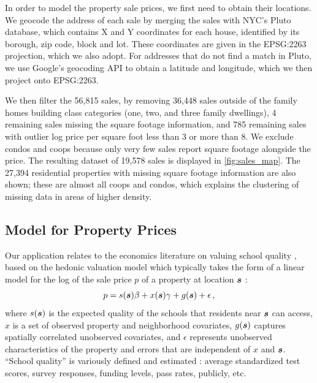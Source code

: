 In order to model the property sale prices, we first need to obtain their locations.
We geocode the address of each sale by merging the sales with NYC's Pluto database, which contains X and Y coordinates for each house, identified by its borough, zip code, block and lot.
These coordinates are given in the EPSG:2263 projection, which we also adopt.
For addresses that do not find a match in Pluto, we use Google's geocoding API to obtain a latitude and longitude, which we then project onto EPSG:2263.

We then filter the 56,815 sales, by removing
36,448 sales outside of the family homes building class categories (one, two, and three family dwellings),
4 remaining sales missing the square footage information,
and 785 remaining sales with outlier log price per square foot less than 3 or more than 8.
We exclude condos and coops because only very few sales report square footage alongside the price.
The resulting dataset of 19,578 sales is displayed in \autoref{fig:sales_map}.
The 27,394 residential properties with missing square footage information are also shown;
these are almost all coops and condos, which explains the clustering of missing data in areas of higher density.

\subsection{Model for Property Prices}

Our application relates to the economics literature on valuing school quality \citep{black2011housing}, 
based on the hedonic valuation model \citep{rosen1974hedonic,sheppard1999hedonic} which typically takes the form of a linear model for the log of the sale price $p$ of a property at location \(\bm{s}\) \citep[see for example][]{gibbons2013valuing}:
\begin{equation}
    p = s(\bm{s})\beta + x(\bm{s})\gamma + g(\bm{s}) + \epsilon
    \,,
    \label{eq:hedonic}
\end{equation}
where \(s(\bm{s})\) is the expected quality of the schools that residents near $\bm{s}$ can access,
$x$ is a set of observed property and neighborhood covariates, $g(\bm{s})$ captures spatially correlated unobserved covariates, and $\epsilon$ represents unobserved characteristics of the property and errors that are independent of $x$ and $\bm{s}$.
``School quality'' is variously defined and estimated \citep{black2011housing}: average standardized test scores, survey responses, funding levels, pass rates, publicly, etc.

